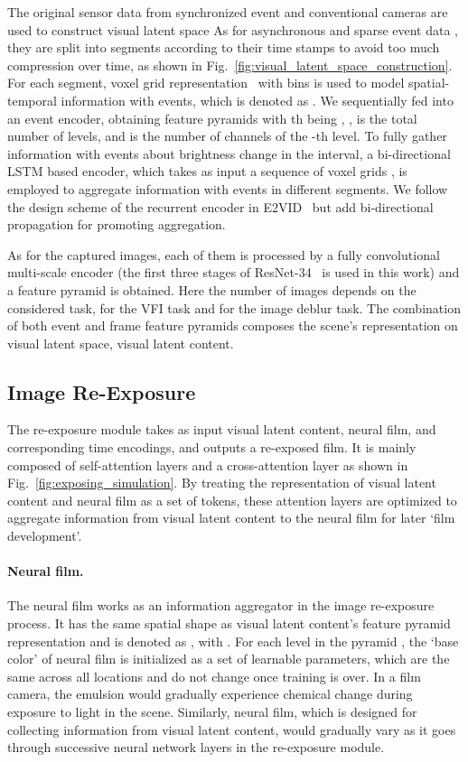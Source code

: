 \documentclass[10pt,twocolumn,letterpaper]{article}
\begin{document}
The original sensor data from synchronized event and conventional cameras are used to construct visual latent space
As for asynchronous and sparse event data , they are split into  segments according to their time stamps to avoid too much compression over time, as shown in Fig.~\ref{fig:visual_latent_space_construction}. For each segment, voxel grid representation~\cite{voxel_grid} with  bins is used to model spatial-temporal information with events, which is denoted as .
We sequentially fed  into an event encoder, obtaining  feature pyramids with th being
, ,  is the total number of levels, and  is the number of channels of the -th level.
To fully gather information with events about brightness change in the interval, a bi-directional LSTM based encoder, which takes as input a sequence of voxel grids , is employed to aggregate information with events in different segments.
We follow the design scheme of the recurrent encoder in E2VID~\cite{E2VID} but add bi-directional propagation for promoting aggregation.


As for the captured  images, each of them is processed by a fully convolutional multi-scale encoder 
(the first three stages of ResNet-34~\cite{ResNet} is used in this work) and a feature pyramid  is obtained. 
Here the number of images  depends on the considered task, \eg  for the VFI task and  for the image deblur task.
The combination of both event and frame feature pyramids composes the scene's representation on visual latent space, \ie visual latent content.



\subsection{Image Re-Exposure}
The re-exposure module takes as input visual latent content, neural film, and corresponding time encodings, and outputs a re-exposed film.
It is mainly composed of self-attention layers and a cross-attention layer as shown in Fig.~\ref{fig:exposing_simulation}.
By treating the representation of visual latent content and neural film as a set of tokens, these attention layers are optimized to aggregate information from visual latent content to the neural film for later `film development'.


\paragraph{Neural film.} 
The neural film works as an information aggregator in the image re-exposure process.
It has the same spatial shape as visual latent content's feature pyramid representation and is denoted as , with .
For each level in the pyramid , the `base color' of neural film is initialized as a set of learnable parameters, which are the same across all locations and do not change once training is over.
In a film camera, the emulsion would gradually experience chemical change during exposure to light in the scene.
Similarly, neural film, which is designed for collecting information from visual latent content, would gradually vary as it goes through successive neural network layers in the re-exposure module.
\end{document}
